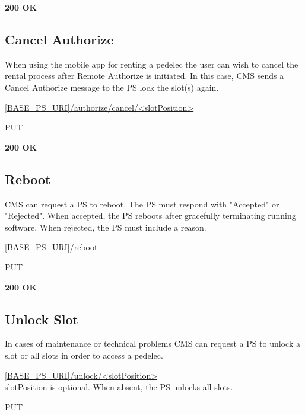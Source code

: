  \textbf{200 OK}


\subsection{Cancel Authorize}

When using the mobile app for renting a pedelec the user can wish to cancel the rental process after Remote Authorize is initiated. In this case, \acs{CMS} sends a Cancel Authorize message to the \acs{PS} lock the slot(s) again.

 \url{[BASE_PS_URI]/authorize/cancel/<slotPosition>}

 PUT


 \textbf{200 OK}


\subsection{Reboot}

\acs{CMS} can request a \acs{PS} to reboot. The \acs{PS} must respond with "Accepted" or "Rejected". When accepted, the \acs{PS} reboots after gracefully terminating running software. When rejected, the \acs{PS} must include a reason.

 \url{[BASE_PS_URI]/reboot}

 PUT


 \textbf{200 OK}


\subsection{Unlock Slot}

In cases of maintenance or technical problems \acs{CMS} can request a \acs{PS} to unlock a slot or all slots in order to access a pedelec. 

 \url{[BASE_PS_URI]/unlock/<slotPosition>} \\
slotPosition is optional. When absent, the \acs{PS} unlocks all slots.

 PUT

